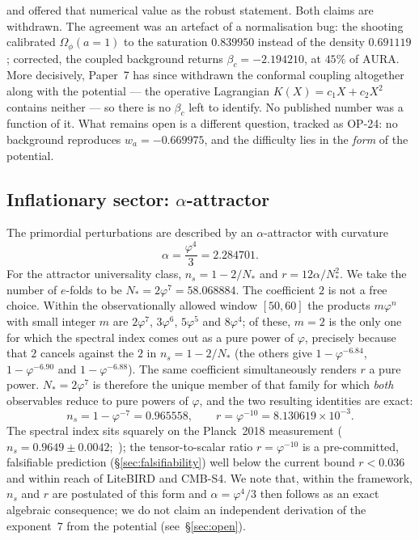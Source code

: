 \documentclass[aps,prd,preprint,amsmath,amssymb,nofootinbib,longbibliography]{revtex4-2}
\begin{document}
and offered that numerical value as the robust statement. Both claims are
withdrawn. The agreement was an artefact of a normalisation bug: the shooting
calibrated $\Omega_\phi(a{=}1)$ to the saturation $0.839950$ instead of the
density $0.691119$; corrected, the coupled background returns
$\beta_c=-2.194210$, at $45\%$ of $\mathrm{AURA}$. More decisively, Paper~7
has since withdrawn the conformal coupling altogether along with the potential
--- the operative Lagrangian $K(X)=c_1X+c_2X^2$ contains neither --- so there
is no $\beta_c$ left to identify. No published number was a function of it.
What remains open is a different question, tracked as OP-24: no background
reproduces $w_a=-0.669975$, and the difficulty lies in the \emph{form} of the
potential.

\subsection{Inflationary sector: $\alpha$-attractor}
\label{sec:inflation}
The primordial perturbations are described by an $\alpha$-attractor
\citep{Kallosh2013} with curvature
\begin{equation}
  \label{eq:alpha-attractor}
  \alpha=\frac{\varphi^4}{3}=2.284701 .
\end{equation}
For the attractor universality class, $n_s=1-2/N_\ast$ and
$r=12\alpha/N_\ast^2$. We take the number of $e$-folds to be
$N_\ast=2\varphi^7=58.068884$. The coefficient $2$ is not a free choice. Within
the observationally allowed window $[50,60]$ the products $m\varphi^n$ with
small integer $m$ are $2\varphi^7$, $3\varphi^6$, $5\varphi^5$ and $8\varphi^4$;
of these, $m=2$ is the only one for which the spectral index comes out as a pure
power of $\varphi$, precisely because that $2$ cancels against the $2$ in
$n_s=1-2/N_\ast$ (the others give $1-\varphi^{-6.84}$, $1-\varphi^{-6.90}$ and
$1-\varphi^{-6.88}$). The same coefficient simultaneously renders $r$ a pure
power. $N_\ast=2\varphi^7$ is therefore the unique member of that family for
which \emph{both} observables reduce to pure powers of $\varphi$, and the two
resulting identities are exact:
\begin{equation}
  \label{eq:ns-r}
  n_s = 1-\varphi^{-7}=0.965558 ,
  \qquad
  r   = \varphi^{-10}=8.130619\times10^{-3} .
\end{equation}
The spectral index sits squarely on the Planck~2018 measurement
($n_s=0.9649\pm0.0042$;~\citealp{Planck2018}); the tensor-to-scalar ratio
$r=\varphi^{-10}$ is a
pre-committed, falsifiable prediction (\S\ref{sec:falsifiability}) well below
the current bound $r<0.036$ and within reach of LiteBIRD and CMB-S4. We note
that, within the framework, $n_s$ and $r$ are postulated of this form and
$\alpha=\varphi^4/3$ then follows as an exact algebraic consequence; we do not
claim an independent derivation of the exponent~$7$ from the potential
(see~\S\ref{sec:open}).
\end{document}
